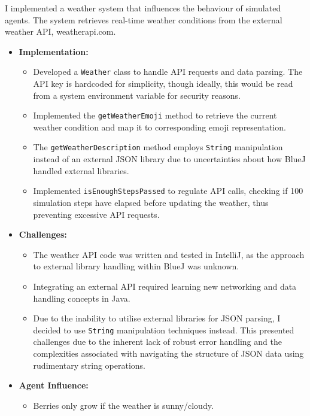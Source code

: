 \documentclass{article}
\begin{document}
I implemented a weather system that influences the behaviour of simulated agents. The system retrieves real-time weather conditions from the external weather API, weatherapi.com.

\begin{itemize}
    \item \textbf{Implementation:}
        \begin{itemize}
            \item Developed a \texttt{Weather} class to handle API requests and data parsing. The API key is hardcoded for simplicity, though ideally, this would be read from a system environment variable for security reasons.
            \item Implemented the \texttt{getWeatherEmoji} method to retrieve the current weather condition and map it to corresponding emoji representation.
            \item The \texttt{getWeatherDescription} method employs \texttt{String} manipulation instead of an external JSON library due to uncertainties about how BlueJ handled external libraries.
            \item Implemented \texttt{isEnoughStepsPassed} to regulate API calls, checking if 100 simulation steps have elapsed before updating the weather, thus preventing excessive API requests.
        \end{itemize}
    \item \textbf{Challenges:}
        \begin{itemize}
            \item The weather API code was written and tested in IntelliJ, as the approach to external library handling within BlueJ was unknown.
            \item Integrating an external API required learning new networking and data handling concepts in Java.
            \item Due to the inability to utilise external libraries for JSON parsing, I decided to use \texttt{String} manipulation techniques instead. This presented challenges due to the inherent lack of robust error handling and the complexities associated with navigating the structure of JSON data using rudimentary string operations.
        \end{itemize}
    \item \textbf{Agent Influence:}
        \begin{itemize}
            \item Berries only grow if the weather is sunny/cloudy.
        \end{itemize}
\end{itemize}
\end{document}
